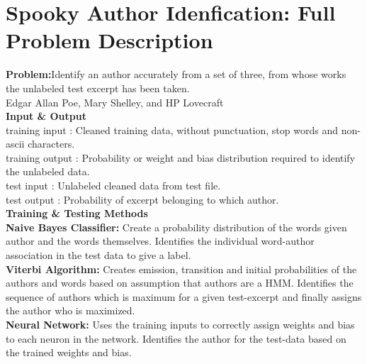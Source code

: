 \documentclass[fleqn,10pt]{SelfArx} %
\begin{document}
\section{Spooky Author Idenfication: Full Problem Description}
\textbf{Problem:}Identify an author accurately from a set of three, from whose works the unlabeled test excerpt has been taken.\\
Edgar Allan Poe, Mary Shelley, and HP Lovecraft\\
\textbf{Input \& Output}\\
training input : Cleaned training data, without punctuation, stop words and non-ascii characters.\\
training output : Probability or weight and bias distribution required to identify the unlabeled data.\\
test input : Unlabeled cleaned data from test file.\\
test output : Probability of excerpt belonging to which author.\\
\textbf{Training \& Testing Methods}\\
\textbf{Naive Bayes Classifier:} Create a probability distribution of the words given author and the words themselves. Identifies the individual word-author association in the test data to give a label.\\
\textbf{Viterbi Algorithm:} Creates emission, transition and initial probabilities of the authors and words based on assumption that authors are a HMM. Identifies the sequence of authors which is maximum for a given test-excerpt and finally assigns the author who is maximized.\\
\textbf{Neural Network:} Uses the training inputs to correctly assign weights and bias to each neuron in the network. Identifies the author for the test-data based on the trained weights and bias.
\end{document}
